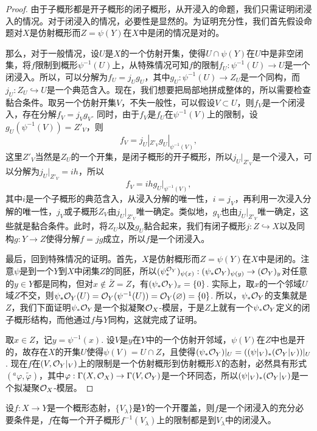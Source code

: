 \begin{proof}
由于子概形都是开子概形的闭子概形，从开浸入的命题，我们只需证明闭浸入的情况。对于闭浸入的情况，必要性是显然的。为证明充分性，我们首先假设命题对$X$是仿射概形而$Z=\psi(Y)$在$X$中是闭的情况是对的。

那么，对于一般情况，设$U$是$X$的一个仿射开集，使得$U\cap \psi(Y)$在$U$中是非空闭集，将$f$限制到概形$\psi^{-1}(U)$上，从特殊情况可知$f$的限制$f_U:\psi^{-1}(U)\to U$是一个闭浸入。所以，可以分解为$f_U=j_Ug_U$，其中$g_U:\psi^{-1}(U)\to Z_U$是一个同构，而$j_U:Z_U\hookrightarrow U$是一个典范含入。现在，我们想要把局部地拼成整体的，所以需要检查黏合条件。取另一个仿射开集$V$，不失一般性，可以假设$V\subset U$，则$f_V$是一个闭浸入，存在分解$f_V=j_Vg_V$. 同时，由于$f_V$是$f_U$在$\psi^{-1}(V)$上的限制，设$g_U(\psi^{-1}(V))=Z'_V$，则
\[
	f_V=j_U|_{Z'_V}g_U|_{\psi^{-1}(V)},
\]
这里$Z'_V$当然是$Z_U$的一个开集，是闭子概形的开子概形，所以$j_U|_{Z'_V}$是一个浸入，可以分解为$j_U|_{Z'_V}=ih$，所以
\[
	f_V=ihg_U|_{\psi^{-1}(V)},
\]
其中$i$是一个子概形的典范含入，从浸入分解的唯一性，$i=j_V$，再利用一次浸入分解的唯一性，$j_V$或子概形$Z_V$由$j_U|_{Z'_V}$唯一确定。类似地，$g_V$也由$j_U|_{Z'_V}$唯一确定，这些就是黏合条件。此时，将$Z_U$以及$g_U$黏合起来，我们有闭子概形$j:Z\hookrightarrow X$以及同构$g:Y\to Z$使得分解$f=jg$成立，所以$f$是一个闭浸入。

最后，回到特殊情况的证明。首先，$X$是仿射概形而$Z=\psi(Y)$在$X$中是闭的。注意$\psi$是到一个$Y$到$X$中闭集$Z$的同胚，所以$(\psi_*^{\mathcal{O}_Y})_{\psi(x)}:(\psi_*\mathcal{O}_Y)_{\psi(y)}\to (\mathcal{O}_Y)_y$对任意的$y\in Y$都是同构，但对$x\not\in \bar Z=Z$，有$(\psi_*\mathcal{O}_Y)_{x}=\{0\}$. 实际上，取$x$的一个邻域$U$域$Z$不交，则$\psi_*\mathcal{O}_Y(U)=\mathcal{O}_Y(\psi^{-1}(U))=\mathcal{O}_Y(\varnothing)=\{0\}$. 所以，$\psi_* \mathcal{O}_Y$的支集就是$Z$，我们下面证明$\psi_*\mathcal{O}_Y$是一个拟凝聚$\mathcal{O}_X$-模层，于是$Z$上就有一个$\psi_*\mathcal{O}_Y$定义的闭子概形结构，而他通过$f$与$Y$同构，这就完成了证明。

取$x\in Z$，记$y=\psi^{-1}(x)$. 设$V$是$y$在$Y$中的一个仿射开邻域，$\psi(V)$在$Z$中也是开的，故存在$X$的开集$U$使得$\psi(V)=U\cap Z$，且使得$(\psi_*\mathcal{O}_Y)|_U=((\psi|_V)_*(\mathcal{O}_Y|_V))|_U$. 现在$f$在$(V,\mathcal{O}_Y|_V)$上的限制是一个仿射概形到仿射概形$X$的态射，必然具有形式$({}^a\varphi,\tilde\varphi)$，其中$\varphi:\Gamma(X,\mathcal{O}_X)\to \Gamma(V,\mathcal{O}_Y)$是一个环同态，所以$(\psi|_V)_*(\mathcal{O}_Y|_V)$是一个拟凝聚$\mathcal{O}_X$-模层。\notprove
\end{proof}

\begin{coro}\label{coro:3.4.12}
设$f:X\to Y$是一个概形态射，$\{V_\lambda\}$是$Y$的一个开覆盖，则$f$是一个闭浸入的充分必要条件是，$f$在每一个开子概形$f^{-1}(V_\lambda)$上的限制都是到$V_\lambda$中的闭浸入。
\end{coro}

